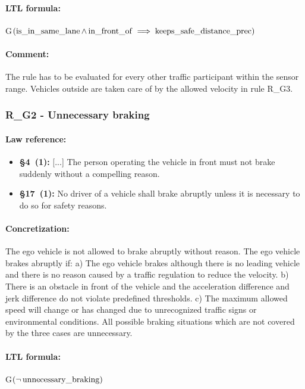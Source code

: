 \paragraph{LTL formula:} G$(\operatorname*{is\_in\_same\_lane} \land \operatorname*{in\_front\_of} \implies \operatorname*{keeps\_safe\_distance\_prec})$

\paragraph{Comment:}
The rule has to be evaluated for every other traffic participant within the sensor range. Vehicles outside are taken care of by the allowed velocity in rule R\_G3. 

\subsubsection{R\_G2 - Unnecessary braking}
\paragraph{Law reference:}
\begin{itemize}
	\item \textbf{\stvo \S 4~(1):} [...] The person operating the vehicle in front must not brake suddenly without a compelling reason.
	\item \textbf{\vcort \S 17~(1):} No driver of a vehicle shall brake abruptly unless it is necessary to do so for safety reasons.
\end{itemize}


\paragraph{Concretization:} The ego vehicle is not allowed to brake abruptly without reason. 
The ego vehicle brakes abruptly if: a) The ego vehicle brakes although there is no leading vehicle and there is no reason caused by a traffic regulation to reduce the velocity. b) There is an obstacle in front of the vehicle and the acceleration difference and jerk difference do not violate predefined thresholds. c) The maximum allowed speed will change or has changed due to unrecognized traffic signs or environmental conditions. All possible braking situations which are not covered by the three cases are unnecessary. 

\paragraph{LTL formula:} G$(\neg \operatorname*{unnecessary\_braking})$

